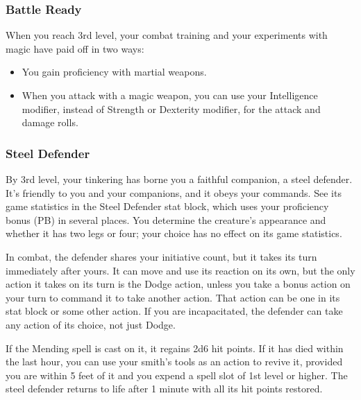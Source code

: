 \documentclass[letterpaper,openany,oneside,twocolumn]{book}
\begin{document}
\subsubsection*{Battle Ready}
When you reach 3rd level, your combat training and your experiments with magic have paid off in two ways:
\begin{itemize}
	\item You gain proficiency with martial weapons.
	\item When you attack with a magic weapon, you can use your Intelligence modifier, instead of Strength or Dexterity modifier, for the attack and damage rolls.
\end{itemize}
\subsubsection*{Steel Defender}
By 3rd level, your tinkering has borne you a faithful companion, a steel defender. It's friendly to you and your companions, and it obeys your commands. See its game statistics in the Steel Defender stat block, which uses your proficiency bonus (PB) in several places. You determine the creature's appearance and whether it has two legs or four; your choice has no effect on its game statistics.

In combat, the defender shares your initiative count, but it takes its turn immediately after yours. It can move and use its reaction on its own, but the only action it takes on its turn is the Dodge action, unless you take a bonus action on your turn to command it to take another action. That action can be one in its stat block or some other action. If you are incapacitated, the defender can take any action of its choice, not just Dodge.

If the Mending spell is cast on it, it regains 2d6 hit points. If it has died within the last hour, you can use your smith's tools as an action to revive it, provided you are within 5 feet of it and you expend a spell slot of 1st level or higher. The steel defender returns to life after 1 minute with all its hit points restored.
\end{document}
